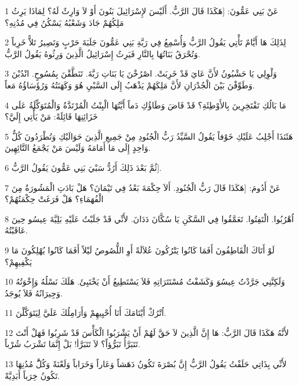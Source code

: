 \par 1 عَنْ بَنِي عَمُّونَ: [هَكَذَا قَالَ الرَّبُّ. أَلَيْسَ لإِسْرَائِيلَ بَنُونَ أَوْ لاَ وَارِثٌ لَهُ؟ لِمَاذَا يَرِثُ مَلِكُهُمْ جَادَ وَشَعْبُهُ يَسْكُنُ فِي مُدُنِهِ؟
\par 2 لِذَلِكَ هَا أَيَّامٌ تَأْتِي يَقُولُ الرَّبُّ وَأُسْمِعُ فِي رَبَّةِ بَنِي عَمُّونَ جَلَبَةَ حَرْبٍ وَتَصِيرُ تَلاًّ خَرِباً وَتُحْرَقُ بَنَاتُهَا بِالنَّارِ فَيَرِثُ إِسْرَائِيلُ الَّذِينَ وَرِثُوهُ يَقُولُ الرَّبُّ.
\par 3 وَلْوِلِي يَا حَشْبُونُ لأَنَّ عَايَ قَدْ خَرِبَتْ. اصْرُخْنَ يَا بَنَاتِ رَبَّةَ. تَنَطَّقْنَ بِمُسُوحٍ. انْدُبْنَ وَطَوِّفْنَ بَيْنَ الْجُدْرَانِ لأَنَّ مَلِكَهُمْ يَذْهَبُ إِلَى السَّبْيِ هُوَ وَكَهَنَتُهُ وَرُؤَسَاؤُهُ مَعاً.
\par 4 مَا بَالُكِ تَفْتَخِرِينَ بِالأَوْطِئَةِ؟ قَدْ فَاضَ وَطَاؤُكِ دَماً أَيَّتُهَا الْبِنْتُ الْمُرْتَدَّةُ وَالْمُتَوَكِّلَةُ عَلَى خَزَائِنِهَا قَائِلَةً: مَنْ يَأْتِي إِلَيَّ؟
\par 5 هَئَنَذَا أَجْلِبُ عَلَيْكِ خَوْفاً يَقُولُ السَّيِّدُ رَبُّ الْجُنُودِ مِنْ جَمِيعِ الَّذِينَ حَوَالَيْكِ وَتُطْرَدُونَ كُلُّ وَاحِدٍ إِلَى مَا أَمَامَهُ وَلَيْسَ مَنْ يَجْمَعُ التَّائِهِينَ.
\par 6 ثُمَّ بَعْدَ ذَلِكَ أَرُدُّ سَبْيَ بَنِي عَمُّونَ يَقُولُ الرَّبُّ].
\par 7 عَنْ أَدُومَ: [هَكَذَا قَالَ رَبُّ الْجُنُودِ. أَلاَ حِكْمَةَ بَعْدُ فِي تَيْمَانَ؟ هَلْ بَادَتِ الْمَشُورَةُ مِنَ الْفُهَمَاءِ؟ هَلْ فَرَغَتْ حِكْمَتُهُمْ؟
\par 8 اُهْرُبُوا. الْتَفِتُوا. تَعَمَّقُوا فِي السَّكَنِ يَا سُكَّانَ دَدَانَ. لأَنِّي قَدْ جَلَبْتُ عَلَيْهِ بَلِيَّةَ عِيسُو حِينَ عَاقَبْتُهُ.
\par 9 لَوْ أَتَاكَ الْقَاطِفُونَ أَفَمَا كَانُوا يَتْرُكُونَ عُلاَلَةً أَوِ اللُّصُوصُ لَيْلاً أَفَمَا كَانُوا يُهْلِكُونَ مَا يَكْفِيهِمْ؟
\par 10 وَلَكِنَّنِي جَرَّدْتُ عِيسُوَ وَكَشَفْتُ مُسْتَتَرَاتِهِ فَلاَ يَسْتَطِيعُ أَنْ يَخْتَبِئَ. هَلَكَ نَسْلُهُ وَإِخْوَتُهُ وَجِيرَانُهُ فَلاَ يُوجَدُ.
\par 11 اُتْرُكْ أَيْتَامَكَ أَنَا أُحْيِيهِمْ وَأَرَامِلُكَ عَلَيَّ لِيَتَوَكَّلْنَ.
\par 12 لأَنَّهُ هَكَذَا قَالَ الرَّبُّ: هَا إِنَّ الَّذِينَ لاَ حَقَّ لَهُمْ أَنْ يَشْرَبُوا الْكَأْسَ قَدْ شَرِبُوا فَهَلْ أَنْتَ تَتَبَرَّأُ تَبَرُّؤاً؟ لاَ تَتَبَرَّأ! بَلْ إِنَّمَا تَشْرَبُ شُرْباً.
\par 13 لأَنِّي بِذَاتِي حَلَفْتُ يَقُولُ الرَّبُّ إِنَّ بُصْرَةَ تَكُونُ دَهَشاً وَعَاراً وَخَرَاباً وَلَعْنَةً وَكُلَُّ مُدُنِهَا تَكُونُ خِرَباً أَبَدِيَّةً.
